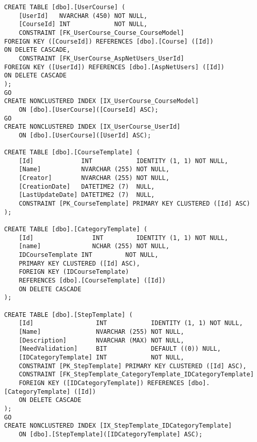 \begin{lstlisting}[style=sql_style, caption=tabelle per la creazione del database utilizzato]
CREATE TABLE [dbo].[UserCourse] ( 
    [UserId]   NVARCHAR (450) NOT NULL, 
    [CourseId] INT            NOT NULL, 
    CONSTRAINT [FK_UserCourse_Course_CourseModel]  
FOREIGN KEY ([CourseId]) REFERENCES [dbo].[Course] ([Id]) 
ON DELETE CASCADE, 
    CONSTRAINT [FK_UserCourse_AspNetUsers_UserId]  
FOREIGN KEY ([UserId]) REFERENCES [dbo].[AspNetUsers] ([Id]) 
ON DELETE CASCADE 
); 
GO 
CREATE NONCLUSTERED INDEX [IX_UserCourse_CourseModel] 
    ON [dbo].[UserCourse]([CourseId] ASC); 
GO 
CREATE NONCLUSTERED INDEX [IX_UserCourse_UserId] 
    ON [dbo].[UserCourse]([UserId] ASC); 
    
CREATE TABLE [dbo].[CourseTemplate] ( 
    [Id]             INT            IDENTITY (1, 1) NOT NULL, 
    [Name]           NVARCHAR (255) NOT NULL, 
    [Creator]        NVARCHAR (255) NOT NULL, 
    [CreationDate]   DATETIME2 (7)  NULL, 
    [LastUpdateDate] DATETIME2 (7)  NULL, 
    CONSTRAINT [PK_CourseTemplate] PRIMARY KEY CLUSTERED ([Id] ASC) 
); 
    
CREATE TABLE [dbo].[CategoryTemplate] ( 
    [Id]                INT         IDENTITY (1, 1) NOT NULL, 
    [name]              NCHAR (255) NOT NULL, 
    IDCourseTemplate INT         NOT NULL, 
    PRIMARY KEY CLUSTERED ([Id] ASC), 
    FOREIGN KEY (IDCourseTemplate)  
    REFERENCES [dbo].[CourseTemplate] ([Id]) 
    ON DELETE CASCADE 
); 
    
CREATE TABLE [dbo].[StepTemplate] ( 
    [Id]                 INT            IDENTITY (1, 1) NOT NULL, 
    [Name]               NVARCHAR (255) NOT NULL, 
    [Description]        NVARCHAR (MAX) NOT NULL, 
    [NeedValidation]     BIT            DEFAULT ((0)) NULL, 
    [IDCategoryTemplate] INT            NOT NULL, 
    CONSTRAINT [PK_StepTemplate] PRIMARY KEY CLUSTERED ([Id] ASC), 
    CONSTRAINT [FK_StepTemplate_CategoryTemplate_IDCategoryTemplate]  
    FOREIGN KEY ([IDCategoryTemplate]) REFERENCES [dbo].[CategoryTemplate] ([Id]) 
    ON DELETE CASCADE 
); 
GO 
CREATE NONCLUSTERED INDEX [IX_StepTemplate_IDCategoryTemplate] 
    ON [dbo].[StepTemplate]([IDCategoryTemplate] ASC);
\end{lstlisting}